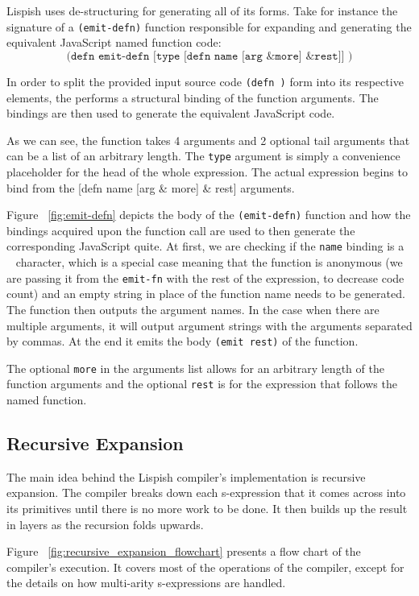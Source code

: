 Lispish uses de-structuring for generating all of its forms. 
Take for instance the signature of a \texttt{(emit-defn)} function responsible for expanding and generating the equivalent JavaScript named function code:
$$ \texttt{(defn emit-defn [type [defn name [arg \& more] \& rest]] )} $$

In order to split the provided input source code \texttt{(defn )} form into its respective elements, the  performs a structural binding of the function arguments. The bindings are then used to generate the equivalent JavaScript code. 

As we can see, the function takes 4 arguments and 2 optional tail arguments that can be a list of an arbitrary length. The \texttt{type} argument is simply a convenience placeholder for the head of the whole expression.
The actual expression begins to bind from the [defn name [arg \& more] \& rest] arguments. 



Figure ~\ref{fig:emit-defn} depicts the body of the \texttt{(emit-defn)} function and how the bindings acquired upon the function call are used to then generate the corresponding JavaScript quite. 
At first, we are checking if the \texttt{name} binding is a \texttt{~} character, which is a special case meaning that the function is anonymous (we are passing it from the \texttt{emit-fn} with the rest of the expression, to decrease code count) and an empty string in place of the function name needs to be generated. The function then outputs the argument names. In the case when there are multiple arguments, it will output argument strings with the arguments separated by commas. 
At the end it emits the body \texttt{(emit rest)} of the function.

The optional \texttt{more} in the arguments list allows for an arbitrary length of the function arguments and the optional \texttt{rest} is for the expression that follows the named function.

\subsection{Recursive Expansion}
The main idea behind the Lispish compiler's implementation is recursive expansion.
The compiler breaks down each s-expression that it comes across into its primitives until there is no more work to be done. It then builds up the result in layers as the recursion folds upwards. 

Figure ~\ref{fig:recursive_expansion_flowchart} presents a flow chart of the compiler's execution. It covers most of the operations of the compiler, except for the details on how multi-arity s-expressions are handled.  

